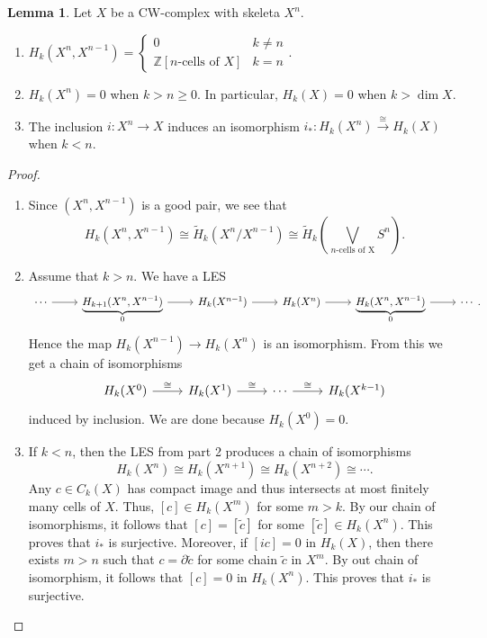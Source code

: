 \documentclass[10pt,letterpaper,cm]{nupset}
\theoremstyle{definition}
\theoremstyle{theorem}
\newtheorem{lemma}[definition]{Lemma}
\theoremstyle{remark}
\newcommand{\Z}{\mathbb Z}
\newcommand{\1}{\mathbb{1}}
\newcommand{\0}{\vec 0}
\begin{document}
\begin{lemma}
Let $X$ be a CW-complex with skeleta $X^n$.
\begin{enumerate}
\item $H_k(X^n, X^{n-1}) =\begin{cases}  0 & k\ne n \\ \Z\left[n\text{-cells of } X\right] & k= n  \end{cases}$.
\item $H_k(X^n) =0$ when $k>n\geq 0$. In particular, $H_k(X) = 0$ when $k> \dim{X}$.
\item The inclusion $i: X^n \to X$ induces an isomorphism $i_{\ast} : H_k(X^n) \overset{\cong}{\longrightarrow} H_k(X)$ when $k<n$.
\end{enumerate}
\end{lemma}
\begin{proof} $ $
\begin{enumerate}
\item Since $(X^n, X^{n-1})$ is a good pair, we see that $$H_k(X^n, X^{n-1}) \cong \widetilde{H}_k(X^n/X^{n-1}) \cong \widetilde{H}_k \left(\bigvee_{n\text{-cells of X}} S^n \right).$$
\item Assume that $k>n$. We have a LES 
\[
\begin{tikzcd}
\cdots \arrow[r] & {\underbrace{H_{k+1}(X^n, X^{n-1})}_{0}} \arrow[r] & H_k(X^{n-1}) \arrow[r] & H_k(X^n) \arrow[r] & {\underbrace{H_k(X^n, X^{n-1})}_{0}} \arrow[r] & \cdots
\end{tikzcd}
.\] Hence the map $H_k(X^{n-1}) \to H_k(X^n)$ is an isomorphism. From this we get a chain of isomorphisms
\[
\begin{tikzcd}
H_k(X^0) \arrow[r, "\cong"] & H_k(X^1) \arrow[r, "\cong"] & \cdots \arrow[r, "\cong"] & H_k(X^{k-1})
\end{tikzcd}
\] induced by inclusion.  We are done because $H_k(X^0)=0$.
\item If $k<n$, then the LES from part 2 produces a chain of isomorphisms 
\[
H_k(X^n) \cong H_k(X^{n+1}) \cong H_k(X^{n+2}) \cong \cdots
.\] Any $c \in C_k(X)$ has compact image and thus intersects at most finitely many cells of $X$. Thus, $[c] \in H_k(X^m)$ for some $m>k$. By our chain of isomorphisms, it follows that $[c] = [\tilde{c}]$ for some $[\tilde{c}]\in H_k(X^n)$. This proves that $i_{\ast}$ is surjective. Moreover, if $[ic] = 0$ in $H_k(X)$, then there exists $m >n$ such that $c = \partial{\tilde{c}}$ for some chain $\tilde{c}$ in $X^m$. By out chain of isomorphism, it follows that $[c]=0$ in $H_k(X^n)$. This proves that $i_{\ast}$ is surjective. 
\end{enumerate}
\end{proof}
\end{document}
